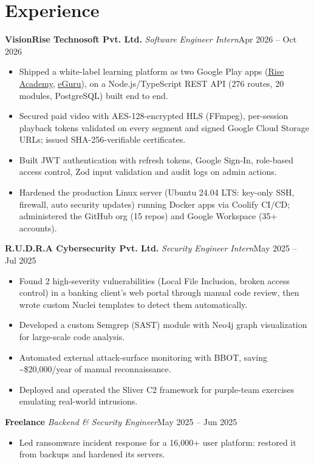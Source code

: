 \documentclass[10pt, a4paper]{article}
\newcommand{\role}[3]{\par\vspace{2.5pt}\textbf{#1} \textbar{} \textit{#2}\hfill #3\par}
\newcommand{\lnk}[2]{\href{#1}{\color{linkc}#2}}
\begin{document}
\section{Experience}
\role{VisionRise Technosoft Pvt. Ltd.}{Software Engineer Intern}{Apr 2026 -- Oct 2026}
\begin{itemize}
  \item Shipped a white-label learning platform as two Google Play apps (\lnk{https://play.google.com/store/apps/details?id=tech.riseinstitute.app}{Rise Academy}, \lnk{https://play.google.com/store/apps/details?id=app.eguru.lms}{eGuru}), on a
  Node.js/TypeScript REST API (276 routes, 20 modules, PostgreSQL) built end to end.
  \item Secured paid video with AES-128-encrypted HLS (FFmpeg), per-session playback tokens validated on every segment and
  signed Google Cloud Storage URLs; issued SHA-256-verifiable certificates.
  \item Built JWT authentication with refresh tokens, Google Sign-In, role-based access control, Zod input validation and audit logs on admin actions.
  \item Hardened the production Linux server (Ubuntu 24.04 LTS: key-only SSH, firewall, auto security updates) running Docker
  apps via Coolify CI/CD; administered the GitHub org (15 repos) and Google Workspace (35+ accounts).
\end{itemize}

\role{R.U.D.R.A Cybersecurity Pvt. Ltd.}{Security Engineer Intern}{May 2025 -- Jul 2025}
\begin{itemize}
  \item Found 2 high-severity vulnerabilities (Local File Inclusion, broken access control) in a banking client's web
  portal through manual code review, then wrote custom Nuclei templates to detect them automatically.
  \item Developed a custom Semgrep (SAST) module with Neo4j graph visualization for large-scale code analysis.
  \item Automated external attack-surface monitoring with BBOT, saving \textasciitilde{}\$20,000/year of manual reconnaissance.
  \item Deployed and operated the Sliver C2 framework for purple-team exercises emulating real-world intrusions.
\end{itemize}

\role{Freelance}{Backend \& Security Engineer}{May 2025 -- Jun 2025}
\begin{itemize}
  \item Led ransomware incident response for a 16,000+ user platform: restored it from backups and hardened its servers.
\end{itemize}
\end{document}
